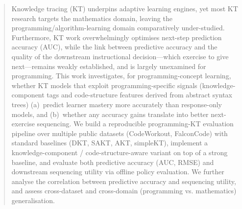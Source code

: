 \begin{abstract}
Knowledge tracing (KT) underpins adaptive learning engines, yet most KT
research targets the mathematics domain, leaving the
programming/algorithm-learning domain comparatively under-studied.
Furthermore, KT work overwhelmingly optimises next-step prediction
accuracy (AUC), while the link between predictive accuracy and the
quality of the downstream instructional decision---which exercise to
give next---remains weakly established, and is largely unexamined for
programming. This work investigates, for programming-concept learning,
whether KT models that exploit programming-specific signals
(knowledge-component tags and code-structure features derived from
abstract syntax trees) (a)~predict learner mastery more accurately than
response-only models, and (b)~whether any accuracy gains translate into
better next-exercise sequencing. We build a reproducible programming-KT
evaluation pipeline over multiple public datasets (CodeWorkout,
FalconCode) with standard baselines (DKT, SAKT, AKT, simpleKT),
implement a knowledge-component / code-structure-aware variant on top of
a strong baseline, and evaluate both predictive accuracy (AUC, RMSE) and
downstream sequencing utility via offline policy evaluation. We further
analyse the correlation between predictive accuracy and sequencing
utility, and assess cross-dataset and cross-domain (programming vs.
mathematics) generalisation.
\end{abstract}
